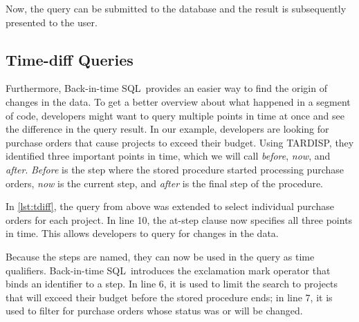 \documentclass[english,conference,final]{IEEEtran}
\newcommand{\tool}{TAR\-DISP}
\newcommand{\SQLextension}{Back-in-time SQL}
\begin{document}

Now, the query can be submitted to the database and the result is subsequently presented to the user.


\subsection{Time-diff Queries}

Furthermore, \SQLextension\ provides an easier way to find the origin of changes in the data.
To get a better overview about what happened in a segment of code, developers might want to query multiple points in time at once and see the difference in the query result.
In our example, developers are looking for purchase orders that cause projects to exceed their budget.
Using \tool, they identified three important points in time, which we will call \emph{before}, \emph{now}, and \emph{after}.
\emph{Before} is the step where the stored procedure started processing purchase orders, \emph{now} is the current step, and \emph{after} is the final step of the procedure.

In \cref{lst:tdiff}, the query from above was extended to select individual purchase orders for each project.
In line 10, the at-step clause now specifies all three points in time.
This allows developers to query for changes in the data.

Because the steps are named, they can now be used in the query as time qualifiers.
\SQLextension\ introduces the exclamation mark operator that binds an identifier to a step.
In line 6, it is used to limit the search to projects that will exceed their budget before the stored procedure ends;
in line 7, it is used to filter for purchase orders whose status was or will be changed.
\end{document}
